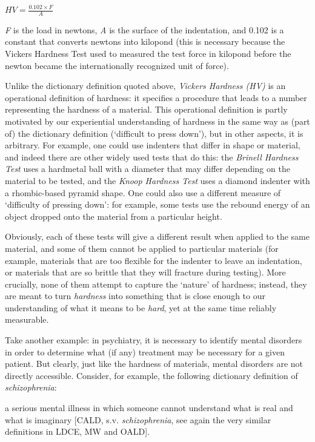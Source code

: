 \begin{exe}
\ex $HV = \frac{0.102 \times F}{A}$ 
\label{ex:vickershardness}
\end{exe}

\textit{F} is the load in newtons, \textit{A} is the surface of the indentation, and 0.102 is a constant that converts newtons into kilopond (this is necessary because the Vickers Hardness Test used to measured the test force in kilopond before the newton became the internationally recognized unit of force).

Unlike the dictionary definition quoted above, \emph{Vickers Hardness (HV)} is an operational definition of hardness: it specifies a procedure that leads to a number representing the hardness of a material. This operational definition is partly motivated by our experiential understanding of hardness in the same way as (part of) the dictionary definition (`difficult to press down'), but in other aspects, it is arbitrary. For example, one could use indenters that differ in shape or material, and indeed there are other widely used tests that do this: the \emph{Brinell Hardness Test} uses a hardmetal ball with a diameter that may differ depending on the material to be tested, and the \emph{Knoop Hardness Test} uses a diamond indenter with a rhombic-based pyramid shape. One could also use a different measure of `difficulty of pressing down': for example, some tests use the rebound energy of an object dropped onto the material from a particular height.

Obviously, each of these tests will give a different result when applied to the same material, and some of them cannot be applied to particular materials (for example, materials that are too flexible for the indenter to leave an indentation, or materials that are so brittle that they will fracture during testing). More crucially, none of them attempt to capture the `nature' of hardness; instead, they are meant to turn \textit{hardness} into something that is close enough to our understanding of what it means to be \textit{hard}, yet at the same time reliably measurable.

Take another example: in psychiatry, it is necessary to identify mental disorders in order to determine what (if any) treatment may be necessary for a given patient. But clearly, just like the hardness of materials, mental disorders are not directly accessible. Consider, for example, the following dictionary definition of \textit{schizophrenia}:

\begin{exe}
\ex a serious mental illness in which someone cannot understand what is real and what is imaginary [CALD, s.v. \textit{schizophrenia}, see again the very similar definitions in LDCE, MW and OALD].
\label{ex:caldschizophrenia}
\end{exe}


